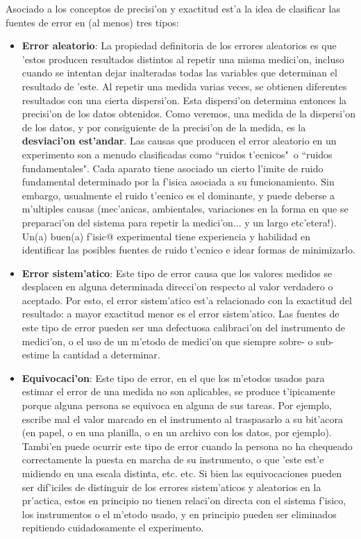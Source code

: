 Asociado a los conceptos de precisi'on y exactitud est'a la idea de clasificar las fuentes de error en (al menos) tres tipos:
\begin{itemize}
\item \textbf{Error aleatorio}: La propiedad definitoria de los errores aleatorios es que 'estos producen resultados distintos al repetir una misma medici'on, incluso cuando se intentan dejar inalteradas todas las variables que determinan el resultado de 'este. Al repetir una medida varias veces, se obtienen diferentes resultados con una cierta dispersi'on. Esta dispersi'on determina entonces la precisi'on de los datos obtenidos. Como veremos, una medida de la dispersi'on de los datos, y por consiguiente de la precisi'on de la medida, es la \textbf{desviaci'on est'andar}. Las causas que producen el error aleatorio en un experimento son a menudo clasificadas como ``ruidos t'ecnicos"\, o ``ruidos fundamentales". Cada aparato tiene asociado un cierto l'imite de ruido fundamental determinado por la f'isica asociada a su funcionamiento. Sin embargo, usualmente el ruido t'ecnico es el dominante, y puede deberse a m'ultiples causas (mec'anicas, ambientales, variaciones en la forma en que se preparaci'on del sistema para repetir la medici'on... y un largo etc'etera!). Un(a) buen(a) f'isic@ experimental tiene experiencia y habilidad en identificar las posibles fuentes de ruido t'ecnico e idear formas de minimizarlo.

\item \textbf{Error sistem'atico}: Este tipo de error causa que los valores medidos se desplacen en alguna determinada direcci'on respecto al valor verdadero o aceptado. Por esto,  el error sistem'atico est'a relacionado con la exactitud del resultado: a mayor exactitud menor es el error sistem'atico. Las fuentes de este tipo de error pueden ser una defectuosa calibraci'on del instrumento de medici'on, o el uso de un m'etodo de medici'on que siempre sobre- o sub-estime la cantidad a determinar.

\item \textbf{Equivocaci'on}: Este tipo de error, en el que los m'etodos usados para estimar el error de una medida no son aplicables, se produce t'ipicamente porque alguna persona se equivoca en alguna de sus tareas. Por ejemplo, escribe mal el valor marcado en el instrumento al traspasarlo a su bit'acora (en papel, o en una planilla, o en un archivo con los datos, por ejemplo). Tambi'en puede ocurrir este tipo de error cuando la persona no ha chequeado correctamente la puesta en marcha de su instrumento, o que 'este est'e midiendo en una escala distinta, etc. etc. Si bien las equivocaciones pueden ser dif'iciles de distinguir de los errores sistem'aticos y aleatorios en la pr'actica, estos en principio no tienen relaci'on directa con el sistema f'isico, los instrumentos o el m'etodo usado, y en principio pueden ser eliminados repitiendo cuidadosamente el experimento.
\end{itemize}

